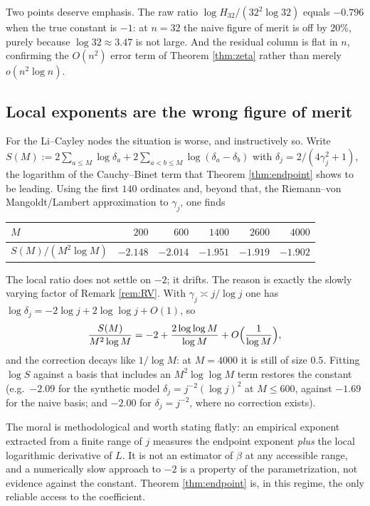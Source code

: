 \documentclass[11pt]{amsart}
\numberwithin{equation}{section}
\theoremstyle{plain}
\theoremstyle{definition}
\theoremstyle{remark}
\begin{document}
Two points deserve emphasis. The raw ratio $\log H_{32}/(32^{2}\log32)$ equals $-0.796$ when the
true constant is $-1$: at $n=32$ the naive figure of merit is off by $20\%$, purely because
$\log32\approx3.47$ is not large. And the residual column is flat in $n$, confirming the $O(n^{2})$
error term of Theorem \ref{thm:zeta} rather than merely $o(n^{2}\log n)$.

\subsection{Local exponents are the wrong figure of merit}

For the Li--Cayley nodes the situation is worse, and instructively so. Write
$S(M):=2\sum_{a\le M}\log\delta_{a}+2\sum_{a<b\le M}\log(\delta_{a}-\delta_{b})$ with
$\delta_{j}=2/(4\gamma_{j}^{2}+1)$, the logarithm of the Cauchy--Binet term that Theorem
\ref{thm:endpoint} shows to be leading. Using the first $140$ ordinates and, beyond that, the
Riemann--von Mangoldt/Lambert approximation to $\gamma_{j}$, one finds

\begin{center}
\begin{tabular}{lrrrrr}
\toprule
$M$ & $200$ & $600$ & $1400$ & $2600$ & $4000$\\
\midrule
$S(M)/(M^{2}\log M)$ & $-2.148$ & $-2.014$ & $-1.951$ & $-1.919$ & $-1.902$\\
\bottomrule
\end{tabular}
\end{center}

The local ratio does not settle on $-2$; it drifts. The reason is exactly the slowly varying factor
of Remark \ref{rem:RV}. With $\gamma_{j}\asymp j/\log j$ one has
$\log\delta_{j}=-2\log j+2\log\log j+O(1)$, so
\[
\frac{S(M)}{M^{2}\log M}=-2+\frac{2\log\log M}{\log M}+O\Bigl(\frac1{\log M}\Bigr),
\]
and the correction decays like $1/\log M$: at $M=4000$ it is still of size $0.5$. Fitting
$\log S$ against a basis that includes an $M^{2}\log\log M$ term restores the constant
(e.g.\ $-2.09$ for the synthetic model $\delta_{j}=j^{-2}(\log j)^{2}$ at $M\le600$, against
$-1.69$ for the naive basis; and $-2.00$ for $\delta_{j}=j^{-2}$, where no correction exists).

The moral is methodological and worth stating flatly: an empirical exponent extracted from a
finite range of $j$ measures the endpoint exponent \emph{plus} the local logarithmic derivative of
$L$. It is not an estimator of $\beta$ at any accessible range, and a numerically slow approach to
$-2$ is a property of the parametrization, not evidence against the constant. Theorem
\ref{thm:endpoint} is, in this regime, the only reliable access to the coefficient.
\end{document}
